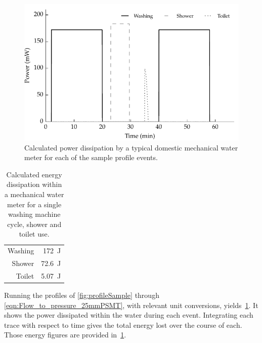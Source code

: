     \begin{figure}
        \centering
        \includegraphics[width=\linewidth]{content/pt1/02-WirelessWaterMeter/graphics/graph_harvest}
        \caption{Calculated power dissipation by a typical domestic mechanical water meter for each of the sample profile events.}
        \label{fig:powerDissipated_meter}
    \end{figure}

    \begin{table}
      \centering
      \begin{tabular}{r|r}
          Washing & \SI{172}{\joule}\\
          Shower  & \SI{72.6}{\joule}\\
          Toilet  & \SI{5.07}{\joule}
      \end{tabular}
      \caption{
          \label{tab:energy_dissipation_figures}
          Calculated energy dissipation within a mechanical water meter for a single washing machine cycle, shower and toilet use.
      }
    \end{table}

    Running the profiles of \cref{fig:profileSample} through \cref{eqn:Flow_to_pressure_25mmPSMT}, with relevant unit conversions, yields~\cref{fig:powerDissipated_meter}.
    It shows the power dissipated within the water during each event.
    Integrating each trace with respect to time gives the total energy lost over the course of each.
    Those energy figures are provided in~\cref{tab:energy_dissipation_figures}.

